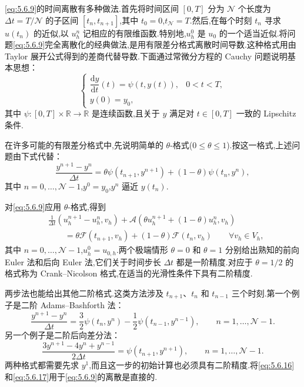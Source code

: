 \eqref{eq:5.6.9}的时间离散有多种做法.首先将时间区间 \([0,T]\) 分为 \(\mathcal N\) 个长度为 \(\Delta t=T/\mathcal N\) 的子区间 \([t_n,t_{n+1}]\),其中 \(t_0=0\),\(t_{\mathcal N}=T\).然后,在每个时刻 \(t_n\) 寻求 \(u(t_n)\) 的近似,以 \(u_h^n\) 记相应的有限维函数.特别地,\(u_h^0\) 是 \(u_0\) 的一个适当近似.将问题\eqref{eq:5.6.9}完全离散化的经典做法,是用有限差分格式离散时间导数.这种格式用由 Taylor 展开公式得到的差商代替导数.下面通过常微分方程的 Cauchy 问题说明基本思想：
\begin{equation}\label{eq:5.6.13}
  \begin{cases}
    \dfrac{\mathrm dy}{\mathrm dt}(t)=\psi(t,y(t)),&0<t<T,\\
    y(0)=y_0,
  \end{cases}
\end{equation}
其中 \(\psi\colon[0,T]\times\mathbb R\to\mathbb R\) 是连续函数,且关于 \(y\) 满足对 \(t\in[0,T]\) 一致的 Lipschitz 条件.

在许多可能的有限差分格式中,先说明简单的 \(\theta\)-格式(\(0\le\theta\le1\)).按这一格式,上述问题由下式代替：
\begin{equation}\label{eq:5.6.14}
  \frac{y^{n+1}-y^n}{\Delta t}
    =\theta\psi(t_{n+1},y^{n+1})+(1-\theta)\psi(t_n,y^n),
\end{equation}
其中 \(n=0,\ldots,\mathcal N-1\),\(y^0=y_0\),\(y^n\) 逼近 \(y(t_n)\).

对\eqref{eq:5.6.9}应用 \(\theta\)-格式,得到
\begin{equation}\label{eq:5.6.15}
  \begin{aligned}
    &\frac1{\Delta t}(u_h^{n+1}-u_h^n,v_h)
     +\mathcal A(\theta u_h^{n+1}+(1-\theta)u_h^n,v_h)\\
    &\qquad=\theta\mathcal F(t_{n+1},v_h)+(1-\theta)\mathcal F(t_n,v_h)
            \qquad\forall v_h\in V_h,
  \end{aligned}
\end{equation}
其中 \(n=0,\ldots,\mathcal N-1\),\(u_h^0=u_{0,h}\).两个极端情形 \(\theta=0\) 和 \(\theta=1\) 分别给出熟知的前向 Euler 法和后向 Euler 法,它们关于时间步长 \(\Delta t\) 都是一阶精度.对应于 \(\theta=1/2\) 的格式称为 Crank--Nicolson 格式,在适当的光滑性条件下具有二阶精度.

两步法也能给出其他二阶格式.这类方法涉及 \(t_{n+1}\)、\(t_n\) 和 \(t_{n-1}\) 三个时刻.第一个例子是二阶 Adams--Bashforth 法：
\begin{equation}\label{eq:5.6.16}
  \frac{y^{n+1}-y^n}{\Delta t}
   =\frac32\psi(t_n,y^n)-\frac12\psi(t_{n-1},y^{n-1}),
   \qquad n=1,\ldots,\mathcal N-1.
\end{equation}
另一个例子是二阶后向差分法：
\begin{equation}\label{eq:5.6.17}
  \frac{3y^{n+1}-4y^n+y^{n-1}}{2\Delta t}=\psi(t_{n+1},y^{n+1}),
    \qquad n=1,\ldots,\mathcal N-1.
\end{equation}
两种格式都需要先求 \(y^1\),而且这一步的初始计算也必须具有二阶精度.将\eqref{eq:5.6.16}和\eqref{eq:5.6.17}用于\eqref{eq:5.6.9}的离散是直接的.

